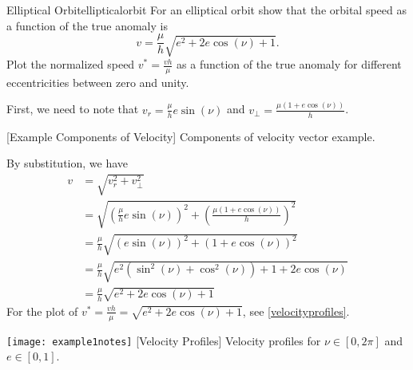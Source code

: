 \begin{examples}{Elliptical Orbit}{ellipticalorbit}
  For an elliptical orbit show that the orbital speed as a function of the true
  anomaly is
  \[ 
  v = \frac{\mu}{h}\sqrt{e^2 + 2e\cos(\nu) + 1}.
  \]
  Plot the normalized speed \(v^* = \frac{vh}{\mu}\) as a function of the true  
  anomaly for different eccentricities between zero and unity.
  \smallskip

  First, we need to note that \(v_r = \frac{\mu}{h}e\sin(\nu)\) and
  \(v_{\perp} = \frac{\mu(1 + e\cos(\nu))}{h}\).
  \par\medskip
  \begin{minipage}{\linewidth}
    \centering
    
    [Example Components of Velocity]
    {Components of velocity vector example.}
    \label{velcomp}
  \end{minipage}
  \par\medskip
  By substitution, we have
  \begin{align*} 
    v & = \sqrt{v_r^2 + v_{\perp}^2}\\
      & = \sqrt{\left(\frac{\mu}{h}e\sin(\nu)\right)^2 
        + \left(\frac{\mu(1 + e\cos(\nu))}{h}\right)^2}\\
      & = \frac{\mu}{h}\sqrt{\left(e\sin(\nu)\right)^2 + (1 + e\cos(\nu))^2}\\
      & = \frac{\mu}{h}\sqrt{e^2(\sin^2(\nu) + \cos^2(\nu)) + 1 +
        2e\cos(\nu)}\\
      & = \frac{\mu}{h}\sqrt{e^2 + 2e\cos(\nu) + 1}
  \end{align*}
  For the plot of \(v^* = \frac{vh}{\mu} = \sqrt{e^2 + 2e\cos(\nu) + 1}\),
  see   \cref{velocityprofiles}.
  \par\medskip
  \begin{minipage}{\linewidth}
    \centering
    \texttt{[image: example1notes]}
    [Velocity Profiles]
    {Velocity profiles for \(\nu\in [0,2\pi]\) and \(e\in[0,1]\).}
    \label{velocityprofiles}
  \end{minipage}
\end{examples}

